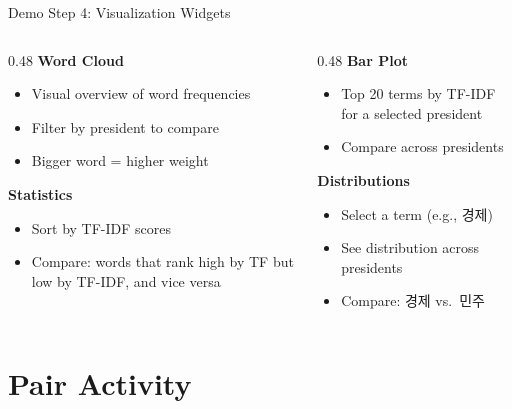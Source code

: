 \documentclass[aspectratio=169,11pt]{beamer}
\begin{document}
\begin{frame}{Demo Step 4: Visualization Widgets}
    \begin{columns}[T]
        \begin{column}{0.48\textwidth}
            \textbf{Word Cloud}
            \begin{itemize}
                \item Visual overview of word frequencies
                \item Filter by president to compare
                \item Bigger word = higher weight
            \end{itemize}

            \vspace{0.4cm}

            \textbf{Statistics}
            \begin{itemize}
                \item Sort by TF-IDF scores
                \item Compare: words that rank high by TF but low by TF-IDF, and vice versa
            \end{itemize}
        \end{column}
        \begin{column}{0.48\textwidth}
            \textbf{Bar Plot}
            \begin{itemize}
                \item Top 20 terms by TF-IDF for a selected president
                \item Compare across presidents
            \end{itemize}

            \vspace{0.4cm}

            \textbf{Distributions}
            \begin{itemize}
                \item Select a term (e.g., 경제)
                \item See distribution across presidents
                \item Compare: 경제 vs.\ 민주
            \end{itemize}
        \end{column}
    \end{columns}
\end{frame}

\section{Pair Activity}
\end{document}
